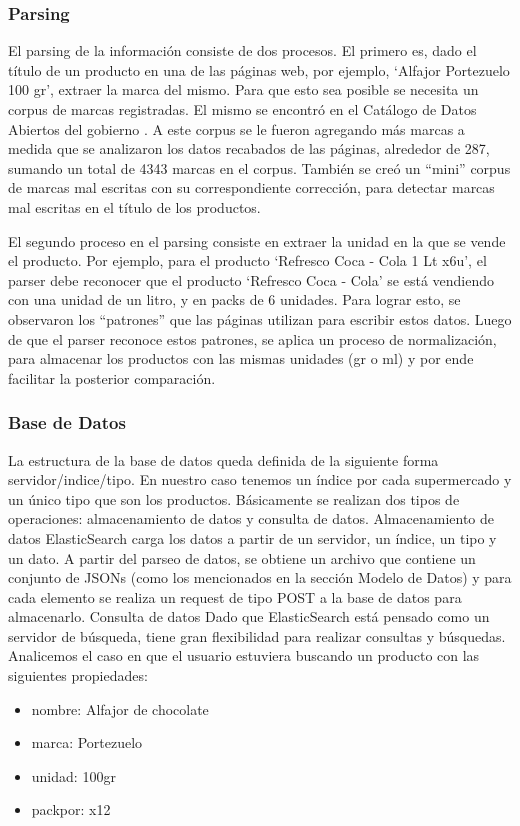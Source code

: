 \documentclass[12pt]{article} %
\begin{document}
\subsubsection{Parsing}

El parsing de la información consiste de dos procesos. El primero es, dado el título de un producto en una de las páginas web, por ejemplo, ‘Alfajor Portezuelo 100 gr’, extraer la marca del mismo. Para que esto sea posible se necesita un corpus de marcas registradas. El mismo se encontró en el Catálogo de Datos Abiertos del gobierno \cite{DatosAbiertos}. A este corpus se le fueron agregando más marcas a medida que se analizaron los datos recabados de las páginas, alrededor de 287, sumando un total de 4343 marcas en el corpus. También se creó un “mini” corpus de marcas mal escritas con su correspondiente corrección, para detectar marcas mal escritas en el título de los productos.

El segundo proceso en el parsing consiste en extraer la unidad en la que se vende el producto. Por ejemplo, para el producto ‘Refresco Coca - Cola 1 Lt x6u’, el parser debe reconocer que el producto ‘Refresco Coca - Cola’ se está vendiendo con una unidad de un litro, y en packs de 6 unidades. Para lograr esto, se observaron los “patrones” que las páginas utilizan para escribir estos datos. Luego de que el parser reconoce estos patrones, se aplica un proceso de normalización, para almacenar los productos con las mismas unidades (gr o ml) y por ende facilitar la posterior comparación.

\subsubsection{Base de Datos}
La estructura de la base de datos queda definida de la siguiente forma servidor/indice/tipo. En nuestro caso tenemos un índice por cada supermercado y un único tipo que son los productos. 
Básicamente se realizan dos tipos de operaciones: almacenamiento de datos y consulta de datos. 
Almacenamiento de datos
ElasticSearch carga los datos a partir de un servidor, un índice, un tipo y un dato. 
A partir del parseo de datos, se obtiene un archivo que contiene un conjunto de JSONs (como los mencionados en la sección Modelo de Datos) y para cada elemento se realiza un request de tipo POST a la base de datos para almacenarlo.
Consulta de datos
Dado que ElasticSearch está pensado como un servidor de búsqueda, tiene gran flexibilidad para realizar consultas y búsquedas. Analicemos el caso en que el usuario estuviera buscando un producto con las siguientes propiedades:
\begin{itemize}
	\item nombre: Alfajor de chocolate
	\item marca: Portezuelo
	\item unidad: 100gr
	\item packpor: x12
\end{itemize}
\end{document}

